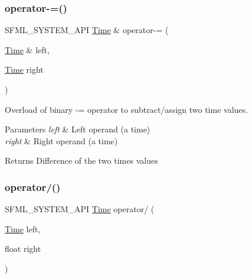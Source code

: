 \subsubsection{\texorpdfstring{operator-\/=()}{operator-=()}}
{\footnotesize\ttfamily S\+F\+M\+L\+\_\+\+S\+Y\+S\+T\+E\+M\+\_\+\+A\+PI \mbox{\hyperlink{classsf_1_1_time}{Time}} \& operator-\/= (\begin{DoxyParamCaption}\item[{\mbox{\hyperlink{classsf_1_1_time}{Time}} \&}]{left,  }\item[{\mbox{\hyperlink{classsf_1_1_time}{Time}}}]{right }\end{DoxyParamCaption})\hspace{0.3cm}{\ttfamily [related]}}



Overload of binary -\/= operator to subtract/assign two time values. 


\begin{DoxyParams}{Parameters}
{\em left} & Left operand (a time) \\
\hline
{\em right} & Right operand (a time)\\
\hline
\end{DoxyParams}
\begin{DoxyReturn}{Returns}
Difference of the two times values \begin{DoxyVerb}\end{DoxyVerb}
 
\end{DoxyReturn}
\mbox{\label{classsf_1_1_time_a3386c392dbc62e51dfa59730854d1ed2}} 
\subsubsection{\texorpdfstring{operator/()}{operator/()}\hspace{0.1cm}{\footnotesize\ttfamily [1/3]}}
{\footnotesize\ttfamily S\+F\+M\+L\+\_\+\+S\+Y\+S\+T\+E\+M\+\_\+\+A\+PI \mbox{\hyperlink{classsf_1_1_time}{Time}} operator/ (\begin{DoxyParamCaption}\item[{\mbox{\hyperlink{classsf_1_1_time}{Time}}}]{left,  }\item[{float}]{right }\end{DoxyParamCaption})\hspace{0.3cm}{\ttfamily [related]}}



